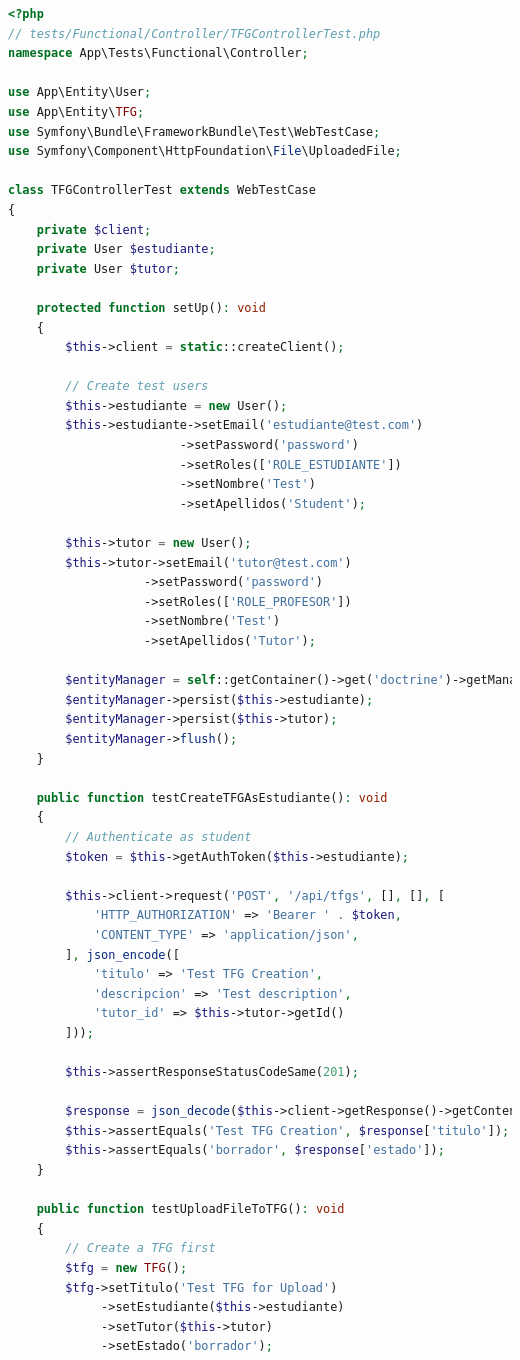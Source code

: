 \documentclass[12pt,a4paper,oneside]{report}
\begin{document}
\begin{lstlisting}[language=PHP]
<?php
// tests/Functional/Controller/TFGControllerTest.php
namespace App\Tests\Functional\Controller;

use App\Entity\User;
use App\Entity\TFG;
use Symfony\Bundle\FrameworkBundle\Test\WebTestCase;
use Symfony\Component\HttpFoundation\File\UploadedFile;

class TFGControllerTest extends WebTestCase
{
    private $client;
    private User $estudiante;
    private User $tutor;

    protected function setUp(): void
    {
        $this->client = static::createClient();
        
        // Create test users
        $this->estudiante = new User();
        $this->estudiante->setEmail('estudiante@test.com')
                        ->setPassword('password')
                        ->setRoles(['ROLE_ESTUDIANTE'])
                        ->setNombre('Test')
                        ->setApellidos('Student');

        $this->tutor = new User();
        $this->tutor->setEmail('tutor@test.com')
                   ->setPassword('password')
                   ->setRoles(['ROLE_PROFESOR'])
                   ->setNombre('Test')
                   ->setApellidos('Tutor');

        $entityManager = self::getContainer()->get('doctrine')->getManager();
        $entityManager->persist($this->estudiante);
        $entityManager->persist($this->tutor);
        $entityManager->flush();
    }

    public function testCreateTFGAsEstudiante(): void
    {
        // Authenticate as student
        $token = $this->getAuthToken($this->estudiante);

        $this->client->request('POST', '/api/tfgs', [], [], [
            'HTTP_AUTHORIZATION' => 'Bearer ' . $token,
            'CONTENT_TYPE' => 'application/json',
        ], json_encode([
            'titulo' => 'Test TFG Creation',
            'descripcion' => 'Test description',
            'tutor_id' => $this->tutor->getId()
        ]));

        $this->assertResponseStatusCodeSame(201);
        
        $response = json_decode($this->client->getResponse()->getContent(), true);
        $this->assertEquals('Test TFG Creation', $response['titulo']);
        $this->assertEquals('borrador', $response['estado']);
    }

    public function testUploadFileToTFG(): void
    {
        // Create a TFG first
        $tfg = new TFG();
        $tfg->setTitulo('Test TFG for Upload')
             ->setEstudiante($this->estudiante)
             ->setTutor($this->tutor)
             ->setEstado('borrador');


\end{lstlisting}
\end{document}
